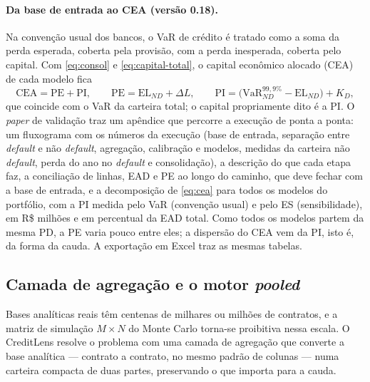 \documentclass[11pt,a4paper]{article}
\newcommand{\VaR}{\mathrm{VaR}}
\begin{document}
\paragraph{Da base de entrada ao CEA (versão 0.18).} Na convenção usual dos bancos, o VaR de crédito é tratado como a soma da perda esperada, coberta pela provisão, com a perda inesperada, coberta pelo capital. Com \eqref{eq:consol} e \eqref{eq:capital-total}, o capital econômico alocado (CEA) de cada modelo fica
\begin{equation}
\mathrm{CEA}=\mathrm{PE}+\mathrm{PI},\qquad \mathrm{PE}=\mathrm{EL}_{ND}+\Delta L,\qquad \mathrm{PI}=\bigl(\VaR^{99{,}9\%}_{ND}-\mathrm{EL}_{ND}\bigr)+K_D,
\label{eq:cea}
\end{equation}
que coincide com o VaR da carteira total; o capital propriamente dito é a PI. O \emph{paper} de validação traz um apêndice que percorre a execução de ponta a ponta: um fluxograma com os números da execução (base de entrada, separação entre \emph{default} e não \emph{default}, agregação, calibração e modelos, medidas da carteira não \emph{default}, perda do ano no \emph{default} e consolidação), a descrição do que cada etapa faz, a conciliação de linhas, EAD e PE ao longo do caminho, que deve fechar com a base de entrada, e a decomposição de \eqref{eq:cea} para todos os modelos do portfólio, com a PI medida pelo VaR (convenção usual) e pelo ES (sensibilidade), em R\$ milhões e em percentual da EAD total. Como todos os modelos partem da mesma PD, a PE varia pouco entre eles; a dispersão do CEA vem da PI, isto é, da forma da cauda. A exportação em Excel traz as mesmas tabelas.

\subsection{Camada de agregação e o motor \emph{pooled}}
\label{sec:agregacao}

Bases analíticas reais têm centenas de milhares ou milhões de contratos, e a matriz de simulação $M\times N$ do Monte Carlo torna-se proibitiva nessa escala. O CreditLens resolve o problema com uma camada de agregação que converte a base analítica --- contrato a contrato, no mesmo padrão de colunas --- numa carteira compacta de duas partes, preservando o que importa para a cauda.
\end{document}
